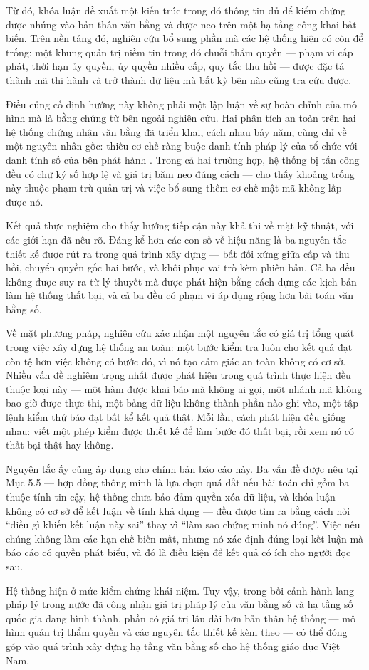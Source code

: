 Từ đó, khóa luận đề xuất một kiến trúc trong đó thông tin đủ để kiểm chứng được nhúng vào bản thân văn bằng và được neo trên một hạ tầng công khai bất biến. Trên nền tảng đó, nghiên cứu bổ sung phần mà các hệ thống hiện có còn để trống: một khung quản trị niềm tin trong đó chuỗi thẩm quyền --- phạm vi cấp phát, thời hạn ủy quyền, ủy quyền nhiều cấp, quy tắc thu hồi --- được đặc tả thành mã thi hành và trở thành dữ liệu mà bất kỳ bên nào cũng tra cứu được.

Điều củng cố định hướng này không phải một lập luận về sự hoàn chỉnh của mô hình mà là bằng chứng từ bên ngoài nghiên cứu. Hai phân tích an toàn trên hai hệ thống chứng nhận văn bằng đã triển khai, cách nhau bảy năm, cùng chỉ về một nguyên nhân gốc: thiếu cơ chế ràng buộc danh tính pháp lý của tổ chức với danh tính số của bên phát hành \cite{Baldi2019, Zonneveld2026}. Trong cả hai trường hợp, hệ thống bị tấn công đều có chữ ký số hợp lệ và giá trị băm neo đúng cách --- cho thấy khoảng trống này thuộc phạm trù quản trị và việc bổ sung thêm cơ chế mật mã không lấp được nó.

Kết quả thực nghiệm cho thấy hướng tiếp cận này khả thi về mặt kỹ thuật, với các giới hạn đã nêu rõ. Đáng kể hơn các con số về hiệu năng là ba nguyên tắc thiết kế được rút ra trong quá trình xây dựng --- bất đối xứng giữa cấp và thu hồi, chuyển quyền gốc hai bước, và khôi phục vai trò kèm phiên bản. Cả ba đều không được suy ra từ lý thuyết mà được phát hiện bằng cách dựng các kịch bản làm hệ thống thất bại, và cả ba đều có phạm vi áp dụng rộng hơn bài toán văn bằng số.

Về mặt phương pháp, nghiên cứu xác nhận một nguyên tắc có giá trị tổng quát trong việc xây dựng hệ thống an toàn: một bước kiểm tra luôn cho kết quả đạt còn tệ hơn việc không có bước đó, vì nó tạo cảm giác an toàn không có cơ sở. Nhiều vấn đề nghiêm trọng nhất được phát hiện trong quá trình thực hiện đều thuộc loại này --- một hàm được khai báo mà không ai gọi, một nhánh mã không bao giờ được thực thi, một bảng dữ liệu không thành phần nào ghi vào, một tập lệnh kiểm thử báo đạt bất kể kết quả thật. Mỗi lần, cách phát hiện đều giống nhau: viết một phép kiểm được thiết kế để làm bước đó thất bại, rồi xem nó có thất bại thật hay không.

Nguyên tắc ấy cũng áp dụng cho chính bản báo cáo này. Ba vấn đề được nêu tại Mục 5.5 --- hợp đồng thông minh là lựa chọn quá đắt nếu bài toán chỉ gồm ba thuộc tính tin cậy, hệ thống chưa bảo đảm quyền xóa dữ liệu, và khóa luận không có cơ sở để kết luận về tính khả dụng --- đều được tìm ra bằng cách hỏi {``}điều gì khiến kết luận này sai{''} thay vì {``}làm sao chứng minh nó đúng{''}. Việc nêu chúng không làm các hạn chế biến mất, nhưng nó xác định đúng loại kết luận mà báo cáo có quyền phát biểu, và đó là điều kiện để kết quả có ích cho người đọc sau.

Hệ thống hiện ở mức kiểm chứng khái niệm. Tuy vậy, trong bối cảnh hành lang pháp lý trong nước đã công nhận giá trị pháp lý của văn bằng số và hạ tầng số quốc gia đang hình thành, phần có giá trị lâu dài hơn bản thân hệ thống --- mô hình quản trị thẩm quyền và các nguyên tắc thiết kế kèm theo --- có thể đóng góp vào quá trình xây dựng hạ tầng văn bằng số cho hệ thống giáo dục Việt Nam.
